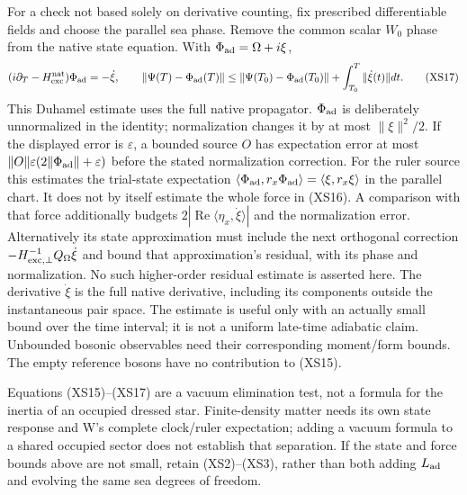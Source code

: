 \documentclass[11pt]{article}
\begin{document}
For a check not based solely on derivative counting, fix
prescribed differentiable fields and choose the parallel sea
phase.  Remove the common scalar $W_0$ phase from the native
state equation.  With $\Phi_{\rm ad}=\Omega+i\xi$,
\begin{equation}
 (i\partial_T-H_{\rm exc}^{\rm nat})\Phi_{\rm ad}
       =-\dot\xi,\qquad
 \|\Psi(T)-\Phi_{\rm ad}(T)\|
 \leq \|\Psi(T_0)-\Phi_{\rm ad}(T_0)\|
                  +\int_{T_0}^T\|\dot\xi(t)\|dt .
 \tag{XS17}
\end{equation}
This Duhamel estimate uses the full native propagator.
$\Phi_{\rm ad}$ is deliberately unnormalized in the identity;
normalization changes it by at most $\|\xi\|^2/2$.
If the displayed error is $\varepsilon$, a bounded source $O$
has expectation error at most
$\|O\|\varepsilon(2\|\Phi_{\rm ad}\|+\varepsilon)$ before
the stated normalization correction.
For the ruler source this estimates the trial-state expectation
$\langle\Phi_{\rm ad},r_x\Phi_{\rm ad}\rangle
=\langle\xi,r_x\xi\rangle$ in the parallel chart.
It does not by itself estimate the whole force in (XS16).
A comparison with that force additionally budgets
$2|\operatorname{Re}\langle\eta_x,\dot\xi\rangle|$ and the
normalization error.  Alternatively its state approximation
must include the next orthogonal correction
$-H_{{\rm exc},\perp}^{-1}Q_\Omega\dot\xi$ and bound that
approximation's residual, with its phase and normalization.
No such higher-order residual estimate is asserted here.
The derivative $\dot\xi$ is the full native derivative,
including its components outside the instantaneous pair space.
The estimate is useful only with an actually small bound over
the time interval; it is not a uniform late-time adiabatic
claim.  Unbounded bosonic observables need their corresponding
moment/form bounds.  The empty reference bosons have no
contribution to (XS15).

Equations (XS15)--(XS17) are a vacuum elimination test, not
a formula for the inertia of an occupied dressed star.
Finite-density matter needs its own state response and W's
complete clock/ruler expectation; adding a vacuum formula
to a shared occupied sector does not establish that separation.
If the state and force bounds above are not small,
retain (XS2)--(XS3), rather than both adding $L_{\rm ad}$
and evolving the same sea degrees of freedom.
\end{document}
